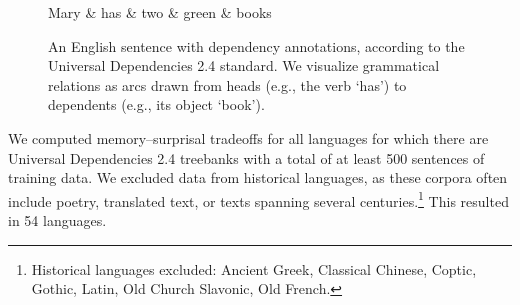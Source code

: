 \begin{figure}
\centering
\begin{dependency}[theme = simple]
   \begin{deptext}[column sep=1em]
Mary \&	 has \& two \& green \& books  \\
   \end{deptext}
\end{dependency}
	\caption{An English sentence with dependency annotations, according to the Universal Dependencies 2.4 standard.
	We visualize grammatical relations as arcs drawn from heads (e.g., the verb `has') to dependents (e.g., its object `book').
	}\label{fig:dependency}
\end{figure}

We computed memory--surprisal tradeoffs for all languages for which there are Universal Dependencies 2.4 treebanks with a total of at least 500 sentences of training data.
We excluded data from historical languages, as these corpora often include poetry, translated text, or texts spanning several centuries.\footnote{Historical languages excluded: Ancient Greek, Classical Chinese, Coptic, Gothic, Latin, Old Church Slavonic, Old French.}
This resulted in 54 languages.

